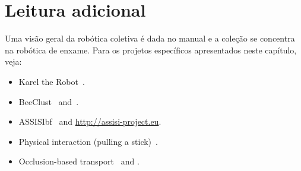 \section{Leitura adicional}

Uma visão geral da robótica coletiva é dada no manual \cite{kernbach2013} e a coleção \cite{sahin2005} se concentra na robótica de enxame. Para os projetos específicos apresentados neste capítulo, veja:
\begin{itemize}
\item Karel the Robot~\cite{karel}.
\item BeeClust~\cite{bodi2012interaction} and~\cite{Schmickl2009}.
\item ASSISIbf~\cite{schmickl2013assisi} and \url{http://assisi-project.eu}.
\item Physical interaction (pulling a stick)~\cite{Ijspeert2001}.
\item Occlusion-based transport~\cite{chen2013strategy} and \cite{gross2015}.
\end{itemize}

